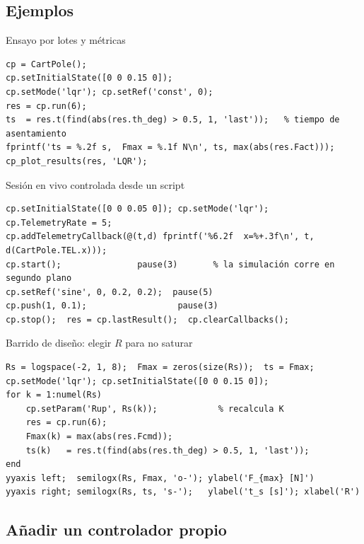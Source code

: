 \subsection{Ejemplos}

\begin{ejemplo}{Ensayo por lotes y métricas}
\begin{lstlisting}
cp = CartPole();
cp.setInitialState([0 0 0.15 0]);
cp.setMode('lqr'); cp.setRef('const', 0);
res = cp.run(6);
ts  = res.t(find(abs(res.th_deg) > 0.5, 1, 'last'));   % tiempo de asentamiento
fprintf('ts = %.2f s,  Fmax = %.1f N\n', ts, max(abs(res.Fact)));
cp_plot_results(res, 'LQR');
\end{lstlisting}
\end{ejemplo}

\begin{ejemplo}{Sesión en vivo controlada desde un script}
\begin{lstlisting}
cp.setInitialState([0 0 0.05 0]); cp.setMode('lqr');
cp.TelemetryRate = 5;
cp.addTelemetryCallback(@(t,d) fprintf('%6.2f  x=%+.3f\n', t, d(CartPole.TEL.x)));
cp.start();               pause(3)       % la simulación corre en segundo plano
cp.setRef('sine', 0, 0.2, 0.2);  pause(5)
cp.push(1, 0.1);                  pause(3)
cp.stop();  res = cp.lastResult();  cp.clearCallbacks();
\end{lstlisting}
\end{ejemplo}

\begin{ejemplo}{Barrido de diseño: elegir $R$ para no saturar}
\begin{lstlisting}
Rs = logspace(-2, 1, 8);  Fmax = zeros(size(Rs));  ts = Fmax;
cp.setMode('lqr'); cp.setInitialState([0 0 0.15 0]);
for k = 1:numel(Rs)
    cp.setParam('Rup', Rs(k));            % recalcula K
    res = cp.run(6);
    Fmax(k) = max(abs(res.Fcmd));
    ts(k)   = res.t(find(abs(res.th_deg) > 0.5, 1, 'last'));
end
yyaxis left;  semilogx(Rs, Fmax, 'o-'); ylabel('F_{max} [N]')
yyaxis right; semilogx(Rs, ts, 's-');   ylabel('t_s [s]'); xlabel('R')
\end{lstlisting}
\end{ejemplo}

\subsection{Añadir un controlador propio}
\label{sec:nuevo_modo}

